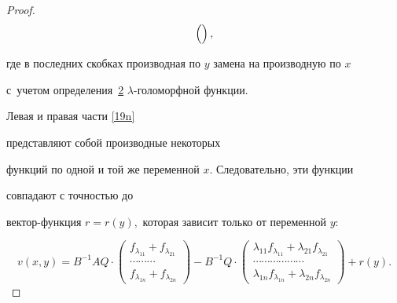 \begin{proof}
\begin{multline}
\begin{pmatrix}
{\rule{0pt}{5mm}  }

\end{pmatrix},

\label{19n}

\end{multline}

где в последних  скобках производная по $y$ замена на производную по $x$

 с~учетом определения~\hyperlink{nik:def2}{2}  $\lambda$-голоморфной функции.



 Левая и правая части  \eqref{19n}

  представляют собой производные некоторых

  функций  по одной и той же переменной  $x.$ Следовательно, эти функции

  совпадают   с точностью до

   вектор-функция $r=r(y),$ которая  зависит только от  переменной $y$:

\begin{equation}

  v(x,y)= B^{-1}AQ\cdot

\begin{pmatrix}

f_{\lambda_{\scriptstyle 11}}+

f_{\lambda_{\scriptstyle 21}}\\

\cdots\cdots\cdots\\

f_{\lambda_{\scriptstyle 1n}}+

f_{\lambda_{\scriptstyle 2n}}

\end{pmatrix}-

B^{-1}Q\cdot

\begin{pmatrix}

\lambda_{11}

f_{\lambda_{\scriptstyle 11}}+

\lambda_{21}f_{\lambda_{\scriptstyle 21}}\\

     \cdots\cdots\cdots\cdots\cdots\cdots\\

\lambda_{1n}

 f_{\lambda_{\scriptstyle 1n}}+

\lambda_{2n} f_{\lambda_{\scriptstyle 2 n}}

\end{pmatrix}+r(y).


\end{equation}
\end{proof}

